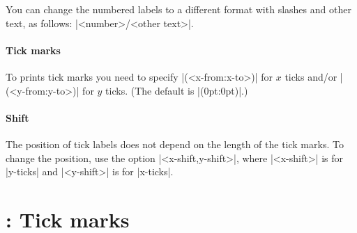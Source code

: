 You can change the numbered labels to a different format with slashes and other text, as follows: |<number>/<other text>|.

\begin{tzcode}{.3}
\end{tzcode}

\paragraph{Tick marks}
To prints tick marks you need to specify |(<x-from:x-to>)| for $x$ ticks and/or |(<y-from:y-to>)| for $y$ ticks. (The default is |(0pt:0pt)|.)

\begin{tzcode}{.3}
\end{tzcode}


\paragraph{Shift}
The position of tick labels does not depend on the length of the tick marks.
To change the position, use the option |<x-shift,y-shift>|, where |<x-shift>| is for |y-ticks| and |<y-shift>| is for |x-ticks|.

\begin{tzcode}{.3}
\end{tzcode}





\section{\protect\cmd{\tzticks*}: Tick marks}
\label{s:tzticks*}


